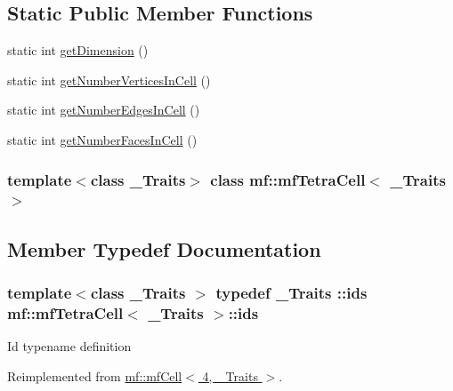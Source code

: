 \subsection*{Static Public Member Functions}
\begin{DoxyCompactItemize}
\item 
static int \hyperlink{classmf_1_1mfTetraCell_a6934653e054673d25dbb1bd8bddbc453}{getDimension} ()
\item 
static int \hyperlink{classmf_1_1mfTetraCell_a6a49b05e337c5aef4647acef176a8bf7}{getNumberVerticesInCell} ()
\item 
static int \hyperlink{classmf_1_1mfTetraCell_a49b7f454b739781a34fb4fa7152b66ac}{getNumberEdgesInCell} ()
\item 
static int \hyperlink{classmf_1_1mfTetraCell_ab0d119e5dd9b50ceaff310f34358a6de}{getNumberFacesInCell} ()
\end{DoxyCompactItemize}
\subsubsection*{template$<$class \_\-Traits$>$ class mf::mfTetraCell$<$ \_\-Traits $>$}



\subsection{Member Typedef Documentation}
\hypertarget{classmf_1_1mfTetraCell_a1fe27f9bfd856ec3464b2b671ceaf558}{
\subsubsection[{ids}]{\setlength{\rightskip}{0pt plus 5cm}template$<$class \_\-Traits $>$ typedef \_\-Traits ::{\bf ids} {\bf mf::mfTetraCell}$<$ \_\-Traits $>$::{\bf ids}}}
\label{classmf_1_1mfTetraCell_a1fe27f9bfd856ec3464b2b671ceaf558}
Id typename definition 

Reimplemented from \hyperlink{classmf_1_1mfCell_a9e32102899fb1e6b5e95b08a6c71063f}{mf::mfCell$<$ 4, \_\-Traits $>$}.




